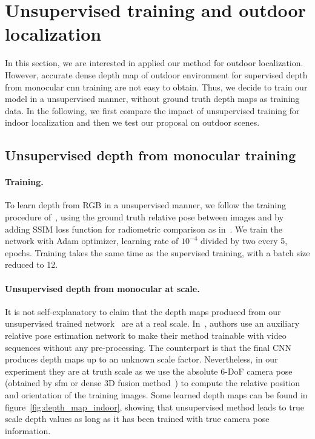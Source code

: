 \section{Unsupervised training and outdoor localization}
\label{sec:outdoor}

In this section, we are interested in applied our method for outdoor localization. However, accurate dense depth map of outdoor environment for supervised depth from monocular \ac{cnn} training are not easy to obtain. Thus, we decide to train our model in a unsupervised manner, \ie without ground truth depth maps as training data. In the following, we first compare the impact of unsupervised training for indoor localization and then we test our proposal on outdoor scenes.

\subsection{Unsupervised depth from monocular training}
\paragraph{Training.} To learn depth from RGB in a unsupervised manner, we follow the training procedure of~\citep{Zhou2017a}, using the ground truth relative pose between images and by adding SSIM loss function for radiometric comparison as in~\citep{Mahjourian2018}. We train the network with Adam optimizer, learning rate of $10^{-4}$ divided by two every 5, epochs. Training takes the same time as the supervised training, with a batch size reduced to 12.

\paragraph{Unsupervised depth from monocular at scale.} It is not self-explanatory to claim that the depth maps produced from our unsupervised trained network~\citep{Zhou2017a} are at a real scale.  In~\citep{Zhou2017a}, authors use an auxiliary relative pose estimation network to make their method trainable with video sequences without any pre-processing. The counterpart is that the final CNN produces depth maps up to an unknown scale factor. Nevertheless, in our experiment they are at truth scale as we use the absolute 6-DoF camera pose (obtained by \ac{sfm} or dense 3D fusion method~\citep{Whelan2015}) to compute the relative position and orientation of the training images. Some learned depth maps can be found in figure~\ref{fig:depth_map_indoor}, showing that unsupervised method leads to true scale depth values as long as it has been trained with true camera pose information.

